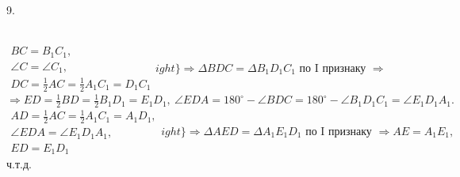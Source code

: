 9. \begin{figure}[ht!]
\end{figure}\\
$\left.\begin{array}{l}BC=B_1C_1,\\
\angle C=\angle C_1,\\
DC=\frac{1}{2}AC=\frac{1}{2}A_1C_1=D_1C_1  \end{array}
ight\}\Rightarrow
\Delta BDC=\Delta B_1D_1C_1\text{ по I признаку }\Rightarrow $\\$\Rightarrow ED=\frac{1}{2}BD=\frac{1}{2}B_1D_1=E_1D_1,\ \angle EDA=180^\circ-\angle BDC=180^\circ-\angle B_1D_1C_1=\angle E_1D_1A_1.$\\
$\left.\begin{array}{l}AD=\frac{1}{2}AC=\frac{1}{2}A_1C_1=A_1D_1,\\
\angle EDA=\angle E_1D_1A_1,\\
ED=E_1D_1  \end{array}
ight\}\Rightarrow \Delta AED=\Delta A_1E_1D_1\text{ по I признаку }\Rightarrow AE=A_1E_1,$ ч.т.д.\\

